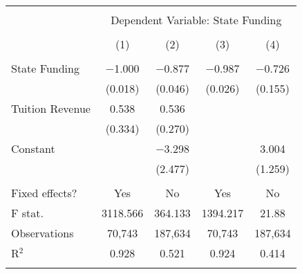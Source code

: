 
\begin{tabular}{@{\extracolsep{5pt}}lcccc} 
\\[-1.8ex]\hline 
\hline \\[-1.8ex] 
 & \multicolumn{4}{c}{Dependent Variable: State Funding} \\ 
\cline{2-5} 
\\[-1.8ex] & (1) & (2) & (3) & (4)\\ 
\hline \\[-1.8ex] 
 State Funding & $-$1.000 & $-$0.877 & $-$0.987 & $-$0.726 \\ 
  & (0.018) & (0.046) & (0.026) & (0.155) \\ 
  Tuition Revenue & 0.538 & 0.536 &  &  \\ 
  & (0.334) & (0.270) &  &  \\ 
  Constant &  & $-$3.298 &  & 3.004 \\ 
  &  & (2.477) &  & (1.259) \\ 
 \hline \\[-1.8ex] 
Fixed effects? & Yes & No & Yes & No \\ 
F stat. & 3118.566 & 364.133 & 1394.217 & 21.88 \\ 
Observations & 70,743 & 187,634 & 70,743 & 187,634 \\ 
R$^{2}$ & 0.928 & 0.521 & 0.924 & 0.414 \\ 
\hline 
\hline \\[-1.8ex] 
\end{tabular} 
